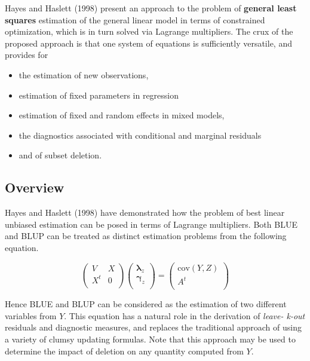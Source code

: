 \documentclass[Main.tex]{subfiles}
\begin{document}
Hayes and Haslett (1998) present an approach to the problem of \textbf{general least squares} estimation of the general linear model in terms of constrained optimization, which is in turn solved via Lagrange multipliers. The crux of the proposed approach is that one system of equations is sufficiently versatile, and provides for \begin{itemize} \item the estimation of new observations, \item estimation of fixed parameters in regression \item estimation of fixed and random effects in mixed models,\item the diagnostics associated with conditional and marginal residuals \item and of subset deletion. \end{itemize}

\subsection{Overview}
Hayes and Haslett (1998) have demonstrated how the problem of best linear unbiased estimation can be posed in terms of Lagrange multipliers. Both BLUE and BLUP can be treated as distinct estimation problems from the following equation.

\begin{equation}
\left(  \begin{array}{cc} V & X \\    X^t & 0 \\
\end{array}\right)\left(  \begin{array}{c}    \boldsymbol{\lambda}_{z}\\   \boldsymbol{\gamma}_z \\  \end{array}
\right)=\left(  \begin{array}{c}    \mbox{cov}(Y,Z)\\   A^{t} \\  \end{array}\right)\end{equation}


Hence BLUE and BLUP can be considered as the estimation of two different variables from $Y$. This equation has a natural role in the derivation of \emph{leave- k-out} residuals and diagnostic measures, and replaces the traditional approach of using a variety of clumsy updating formulas. Note that this approach may be used to determine the impact of deletion on any quantity computed from $Y$.
\end{document}
